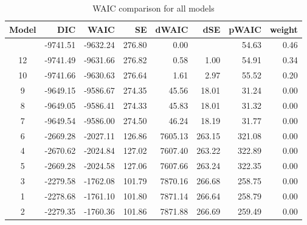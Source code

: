 \documentclass[
sn-apacite
]{sn-jnl}
\begin{document}
\begin{longtable}[]{@{}crrrrrrr@{}}

\caption{\label{tbl-rq3-waic}WAIC comparison for all models}

\tabularnewline

\toprule\noalign{}
Model & DIC & WAIC & SE & dWAIC & dSE & pWAIC & weight \\
\midrule\noalign{}
\endhead
\bottomrule\noalign{}
\endlastfoot
11 & -9741.51 & -9632.24 & 276.80 & 0.00 & & 54.63 & 0.46 \\
12 & -9741.49 & -9631.66 & 276.82 & 0.58 & 1.00 & 54.91 & 0.34 \\
10 & -9741.66 & -9630.63 & 276.64 & 1.61 & 2.97 & 55.52 & 0.20 \\
9 & -9649.15 & -9586.67 & 274.35 & 45.56 & 18.01 & 31.24 & 0.00 \\
8 & -9649.05 & -9586.41 & 274.33 & 45.83 & 18.01 & 31.32 & 0.00 \\
7 & -9649.54 & -9586.00 & 274.50 & 46.24 & 18.19 & 31.77 & 0.00 \\
6 & -2669.28 & -2027.11 & 126.86 & 7605.13 & 263.15 & 321.08 & 0.00 \\
4 & -2670.62 & -2024.84 & 127.02 & 7607.40 & 263.22 & 322.89 & 0.00 \\
5 & -2669.28 & -2024.58 & 127.06 & 7607.66 & 263.24 & 322.35 & 0.00 \\
3 & -2279.58 & -1762.08 & 101.79 & 7870.16 & 266.68 & 258.75 & 0.00 \\
1 & -2278.68 & -1761.10 & 101.80 & 7871.14 & 266.64 & 258.79 & 0.00 \\
2 & -2279.35 & -1760.36 & 101.86 & 7871.88 & 266.69 & 259.49 & 0.00 \\

\end{longtable}
\end{document}
